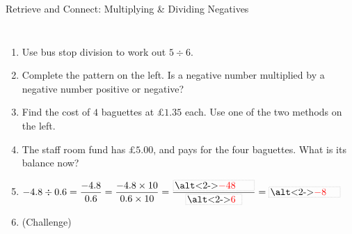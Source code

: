 \documentclass{beamer}
\newcommand{\ashow}[1]{\uncover<2->{\textcolor{red}{\small #1}}}
\newcommand{\abox}[1]{%
  \tikz[baseline=(b.base)]\node[draw=gray, densely dotted, inner sep=1.5pt] (b)
    {\alt<2->{\textcolor{red}{#1}}{\phantom{#1}}};%
}
\newcommand{\tightlist}{%
  \setlength{\itemsep}{0pt}\setlength{\parskip}{0pt}\setlength{\topsep}{0pt}%
}
\begin{document}
\begin{frame}[t]{Retrieve and Connect: Multiplying \& Dividing Negatives}
\begin{columns}[T,onlytextwidth]
\vspace{-1.5em}
\footnotesize
\begin{enumerate}\tightlist
{}
  \item Use bus stop division to work out $5\div6$.
        \ashow{$0.8\dot{3}$}
  \item Complete the pattern on the left. Is a negative number multiplied by a
        negative number positive or negative?
        \ashow{Positive}
  \item Find the cost of $4$ baguettes at £$1.35$ each. Use one of the two methods on
        the left.
        \ashow{£$5.40$}
  \item The staff room fund has £$5.00$, and pays for the four baguettes. What is its
        balance now?
        \ashow{$5.00-5.40=-0.40$, so $-$£$0.40$}
  \item $-4.8\div0.6=\dfrac{-4.8}{0.6}=\dfrac{-4.8\times10}{0.6\times10}
        =\dfrac{\abox{$-48$}}{\abox{$6$}}=\abox{$-8$}$
  \item[] \vspace{3pt}(Challenge)
\end{enumerate}
\end{columns}
\end{frame}
\end{document}
